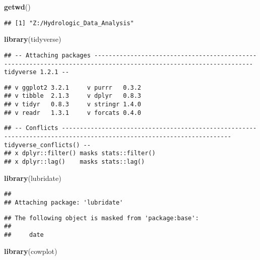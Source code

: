 \documentclass[]{article}
\newenvironment{Shaded}{\begin{snugshade}}{\end{snugshade}}
\newcommand{\KeywordTok}[1]{\textcolor[rgb]{0.13,0.29,0.53}{\textbf{#1}}}
\newcommand{\NormalTok}[1]{#1}
\begin{document}
\begin{Shaded}
\begin{Highlighting}[]
\KeywordTok{getwd}\NormalTok{()}
\end{Highlighting}
\end{Shaded}

\begin{verbatim}
## [1] "Z:/Hydrologic_Data_Analysis"
\end{verbatim}

\begin{Shaded}
\begin{Highlighting}[]
\KeywordTok{library}\NormalTok{(tidyverse)}
\end{Highlighting}
\end{Shaded}

\begin{verbatim}
## -- Attaching packages ------------------------------------------------------------------------------------------------------------------ tidyverse 1.2.1 --
\end{verbatim}

\begin{verbatim}
## v ggplot2 3.2.1     v purrr   0.3.2
## v tibble  2.1.3     v dplyr   0.8.3
## v tidyr   0.8.3     v stringr 1.4.0
## v readr   1.3.1     v forcats 0.4.0
\end{verbatim}

\begin{verbatim}
## -- Conflicts --------------------------------------------------------------------------------------------------------------------- tidyverse_conflicts() --
## x dplyr::filter() masks stats::filter()
## x dplyr::lag()    masks stats::lag()
\end{verbatim}

\begin{Shaded}
\begin{Highlighting}[]
\KeywordTok{library}\NormalTok{(lubridate)}
\end{Highlighting}
\end{Shaded}

\begin{verbatim}
## 
## Attaching package: 'lubridate'
\end{verbatim}

\begin{verbatim}
## The following object is masked from 'package:base':
## 
##     date
\end{verbatim}

\begin{Shaded}
\begin{Highlighting}[]
\KeywordTok{library}\NormalTok{(cowplot)}
\end{Highlighting}
\end{Shaded}
\end{document}
